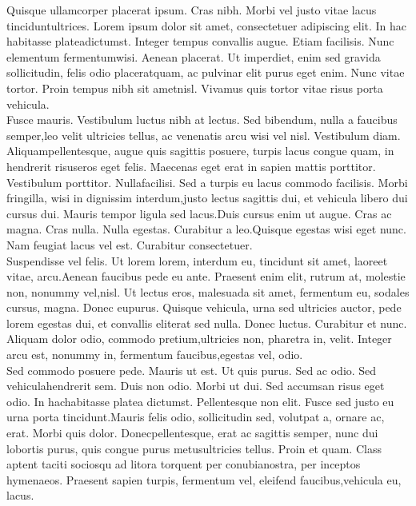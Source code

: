 \documentclass[11pt,
               a4paper,
               parskip=half,
               ]{scrartcl}
\begin{document}
Quisque ullamcorper placerat ipsum. Cras nibh. Morbi vel justo vitae lacus tinciduntultrices. Lorem ipsum dolor sit amet, consectetuer adipiscing elit. In hac habitasse plateadictumst. Integer tempus convallis augue. Etiam facilisis. Nunc elementum fermentumwisi. Aenean placerat. Ut imperdiet, enim sed gravida sollicitudin, felis odio placeratquam, ac pulvinar elit purus eget enim. Nunc vitae tortor. Proin tempus nibh sit ametnisl. Vivamus quis tortor vitae risus porta vehicula.\\
 
 Fusce mauris. Vestibulum luctus nibh at lectus. Sed bibendum, nulla a faucibus semper,leo velit ultricies tellus, ac venenatis arcu wisi vel nisl. Vestibulum diam. Aliquampellentesque, augue quis sagittis posuere, turpis lacus congue quam, in hendrerit risuseros eget felis. Maecenas eget erat in sapien mattis porttitor. Vestibulum porttitor. Nullafacilisi. Sed a turpis eu lacus commodo facilisis. Morbi fringilla, wisi in dignissim interdum,justo lectus sagittis dui, et vehicula libero dui cursus dui. Mauris tempor ligula sed lacus.Duis cursus enim ut augue. Cras ac magna. Cras nulla. Nulla egestas. Curabitur a leo.Quisque egestas wisi eget nunc. Nam feugiat lacus vel est. Curabitur consectetuer.\\
 
 Suspendisse vel felis. Ut lorem lorem, interdum eu, tincidunt sit amet, laoreet vitae, arcu.Aenean faucibus pede eu ante. Praesent enim elit, rutrum at, molestie non, nonummy vel,nisl. Ut lectus eros, malesuada sit amet, fermentum eu, sodales cursus, magna. Donec eupurus. Quisque vehicula, urna sed ultricies auctor, pede lorem egestas dui, et convallis eliterat sed nulla. Donec luctus. Curabitur et nunc. Aliquam dolor odio, commodo pretium,ultricies non, pharetra in, velit. Integer arcu est, nonummy in, fermentum faucibus,egestas vel, odio.\\
 
 Sed commodo posuere pede. Mauris ut est. Ut quis purus. Sed ac odio. Sed vehiculahendrerit sem. Duis non odio. Morbi ut dui. Sed accumsan risus eget odio. In hachabitasse platea dictumst. Pellentesque non elit. Fusce sed justo eu urna porta tincidunt.Mauris felis odio, sollicitudin sed, volutpat a, ornare ac, erat. Morbi quis dolor. Donecpellentesque, erat ac sagittis semper, nunc dui lobortis purus, quis congue purus metusultricies tellus. Proin et quam. Class aptent taciti sociosqu ad litora torquent per conubianostra, per inceptos hymenaeos. Praesent sapien turpis, fermentum vel, eleifend faucibus,vehicula eu, lacus.\\
 
\end{document}
